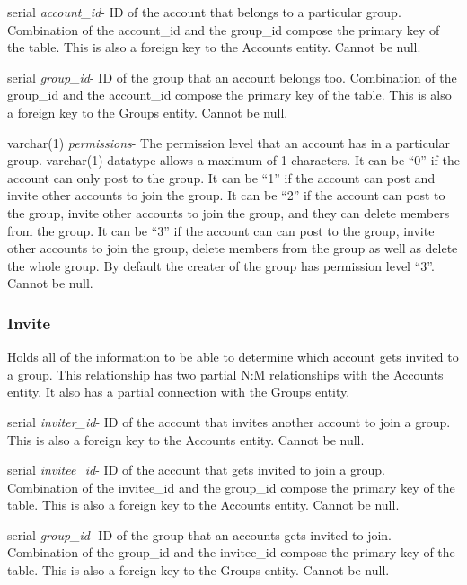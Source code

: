 \begin{description}
\item serial \textit{account\_id}-  ID of the account that belongs to a particular group.  Combination of the account\_id and the group\_id compose the primary key of the table.  This is also a foreign key to the Accounts entity.  Cannot be null.
\item serial \textit{group\_id}- ID of the group that an account belongs too.  Combination of the group\_id and the account\_id compose the primary key of the table.  This is also a foreign key to the Groups entity.  Cannot be null.
\item varchar(1) \textit{permissions}- The permission level that an account has in a particular group.  varchar(1) datatype allows a maximum of 1 characters.  It can be ``0'' if the account can only post to the group.  It can be ``1'' if the account can post and invite other accounts to join the group.  It can be ``2'' if the account can post to the group, invite other accounts to join the group, and they can delete members from the group.  It can be ``3'' if the account can can post to the group, invite other accounts to join the group, delete members from the group as well as delete the whole group.  By default the creater of the group has permission level ``3''.  Cannot be null.
\end{description}

\subsubsection{Invite}
Holds all of the information to be able to determine which account gets invited to a group.  This relationship has two partial N:M relationships with the Accounts entity.  It also has a partial connection with the Groups entity.

\begin{description}
\item serial \textit{inviter\_id}-  ID of the account that invites another account to join a group.  This is also a foreign key to the Accounts entity.  Cannot be null.
\item serial \textit{invitee\_id}- ID of the account that gets invited to join a group.  Combination of the invitee\_id and the group\_id compose the primary key of the table.  This is also a foreign key to the Accounts entity.  Cannot be null.
\item serial \textit{group\_id}-  ID of the group that an accounts gets invited to join.  Combination of the group\_id and the invitee\_id compose the primary key of the table.  This is also a foreign key to the Groups entity.  Cannot be null.
\end{description}


